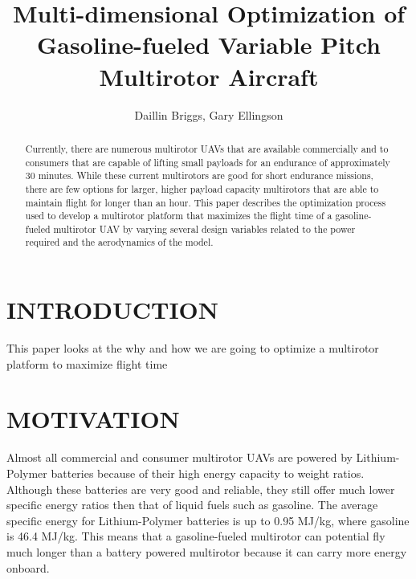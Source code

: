 \documentclass[letterpaper, 10 pt, conference]{ieeeconf}  %
\title{\LARGE \bf
Multi-dimensional Optimization of Gasoline-fueled Variable Pitch Multirotor Aircraft
}
\author{Daillin Briggs, Gary Ellingson%
}
\begin{document}
\maketitle
\thispagestyle{empty}
\pagestyle{empty}


\begin{abstract}

Currently, there are numerous multirotor UAVs that are available commercially and to consumers that are capable of lifting small payloads for an endurance of approximately 30 minutes. While these current multirotors are good for short endurance missions, there are few options for larger, higher payload capacity multirotors that are able to maintain flight for longer than an hour. This paper describes the optimization process used to develop a multirotor platform that maximizes the flight time of a gasoline-fueled multirotor UAV by varying several design variables related to the power required and the aerodynamics of the model.

\end{abstract}


\section{INTRODUCTION}

This paper looks at the why and how we are going to optimize a multirotor platform to maximize flight time 




\section{MOTIVATION}

Almost all commercial and consumer multirotor UAVs are powered by Lithium-Polymer batteries because of their high energy capacity to weight ratios. Although these batteries are very good and reliable, they still offer much lower specific energy ratios then that of liquid fuels such as gasoline. The average specific energy for Lithium-Polymer batteries is up to 0.95 MJ/kg, where gasoline is 46.4 MJ/kg. This means that a gasoline-fueled multirotor can potential fly much longer than a battery powered multirotor because it can carry more energy onboard. 
\end{document}
